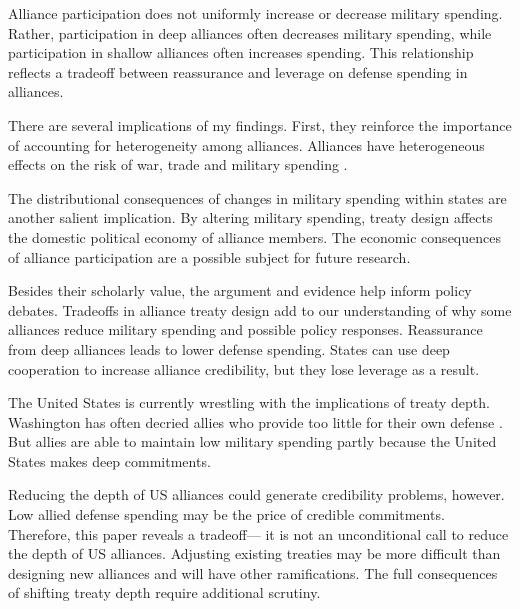\documentclass[12pt]{article}
\begin{document}
Alliance participation does not uniformly increase or decrease military spending. 
Rather, participation in deep alliances often decreases military spending, while participation in shallow alliances often increases spending. 
This relationship reflects a tradeoff between reassurance and leverage on defense spending in alliances. 


There are several implications of my findings.  
First, they reinforce the importance of accounting for heterogeneity among alliances.
Alliances have heterogeneous effects on the risk of war, trade and military spending \citep{Leeds2003, LongLeeds2006, Benson2012, DigiuseppePoast2016}. 


The distributional consequences of changes in military spending within states are another salient implication.  
By altering military spending, treaty design affects the domestic political economy of alliance members. 
The economic consequences of alliance participation are a possible subject for future research. 


Besides their scholarly value, the argument and evidence help inform policy debates. 
Tradeoffs in alliance treaty design add to our understanding of why some alliances reduce military spending and possible policy responses. 
Reassurance from deep alliances leads to lower defense spending. 
States can use deep cooperation to increase alliance credibility, but they lose leverage as a result. 


The United States is currently wrestling with the implications of treaty depth. 
Washington has often decried allies who provide too little for their own defense \citep{Lanoszka2015}. 
But allies are able to maintain low military spending partly because the United States makes deep commitments. 


Reducing the depth of US alliances could generate credibility problems, however. 
Low allied defense spending may be the price of credible commitments.  
Therefore, this paper reveals a tradeoff--- it is not an unconditional call to reduce the depth of US alliances. 
Adjusting existing treaties may be more difficult than designing new alliances and will have other ramifications. 
The full consequences of shifting treaty depth require additional scrutiny. 

 



 
 
\end{document}
